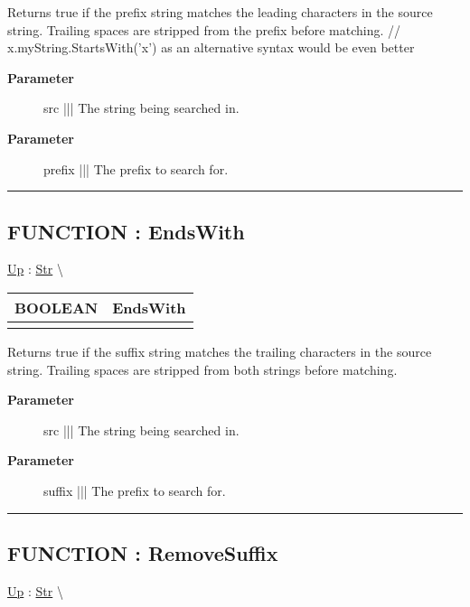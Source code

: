 \par
Returns true if the prefix string matches the leading characters in the source string. Trailing spaces are stripped from the prefix before matching. // x.myString.StartsWith('x') as an alternative syntax would be even better

\par
\begin{description}
\item [\textbf{Parameter}] src ||| The string being searched in.
\item [\textbf{Parameter}] prefix ||| The prefix to search for.
\end{description}

\rule{\linewidth}{0.5pt}
\subsection*{FUNCTION : EndsWith}
\hypertarget{ecldoc:str.endswith}{}
\hyperlink{ecldoc:Str}{Up} :
\hspace{0pt} \hyperlink{ecldoc:Str}{Str} \textbackslash 

{\renewcommand{\arraystretch}{1.5}
\begin{tabularx}{\textwidth}{|>{\raggedright\arraybackslash}l|X|}
\hline
\hspace{0pt}BOOLEAN & EndsWith \\
\hline
\multicolumn{2}{|>{\raggedright\arraybackslash}X|}{\hspace{0pt}(STRING src, STRING suffix)} \\
\hline
\end{tabularx}
}

\par
Returns true if the suffix string matches the trailing characters in the source string. Trailing spaces are stripped from both strings before matching.

\par
\begin{description}
\item [\textbf{Parameter}] src ||| The string being searched in.
\item [\textbf{Parameter}] suffix ||| The prefix to search for.
\end{description}

\rule{\linewidth}{0.5pt}
\subsection*{FUNCTION : RemoveSuffix}
\hypertarget{ecldoc:str.removesuffix}{}
\hyperlink{ecldoc:Str}{Up} :
\hspace{0pt} \hyperlink{ecldoc:Str}{Str} \textbackslash 

